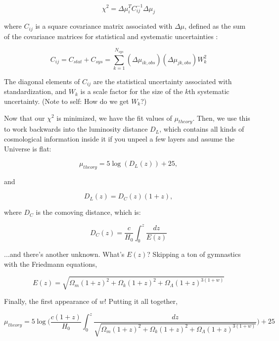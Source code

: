 \begin{equation}
    \chi^{2} = \Delta\mu_{i}^{T} C_{ij}^{-1} \Delta\mu_{j}
\end{equation}

where $C_{ij}$ is a square covariance matrix associated with $\Delta\mu$, defined as the sum of the covariance matrices for statistical and systematic uncertainties \cite{brout2019}:

\begin{equation}
    C_{ij} = C_{stat} + C_{sys} =  \sum_{k=1}^{N_{sys}} (\Delta\mu_{ik,obs}) (\Delta\mu_{jk,obs}) W_{k}^{2}
\end{equation}

The diagonal elements of $C_{ij}$ are the statistical uncertainty associated with standardization, and $W_{k}$ is a scale factor for the size of the $k$th systematic uncertainty. (Note to self: How do we get $W_{k}$?)

Now that our $\chi^{2}$ is minimized, we have the fit values of $\mu_{theory}$. Then, we use this to work backwards into the luminosity distance $D_{L}$, which contains all kinds of cosmological information inside it if you unpeel a few layers and assume the Universe is flat:

\begin{equation}
    \mu_{theory} = 5\log(D_{L}(z)) + 25,
\end{equation}

and

\begin{equation}
    D_{L}(z) =  D_{C}(z)(1+z),
\end{equation}

where $D_{C}$ is the comoving distance, which is:

\begin{equation}
    D_{C}(z) = \frac{c}{H_{0}} \int_{0}^{z} \frac{dz}{E(z)}
\end{equation}

...and there's another unknown. What's $E(z)$? Skipping a ton of gymnastics with the Friedmann equations,

\begin{equation}
    E(z) = \sqrt{\Omega_{m}(1+z)^{2} + \Omega_{k}(1+z)^{2} + \Omega_{\Lambda}(1+z)^{3(1+w)}}
\end{equation}

Finally, the first appearance of $w$! Putting it all together,

\begin{equation}
    \mu_{theory} = 5\log\Bigg(\frac{c(1+z)}{H_{0}} \int_{0}^{z} \frac{dz}{\sqrt{\Omega_{m}(1+z)^{2} + \Omega_{k}(1+z)^{2} + \Omega_{\Lambda}(1+z)^{3(1+w)}}}\Bigg) + 25
\end{equation}

